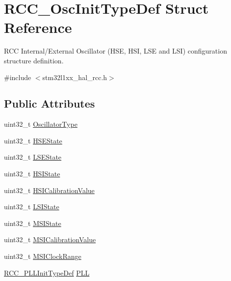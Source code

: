 \hypertarget{struct_r_c_c___osc_init_type_def}{\section{R\-C\-C\-\_\-\-Osc\-Init\-Type\-Def Struct Reference}
\label{struct_r_c_c___osc_init_type_def}
}


R\-C\-C Internal/\-External Oscillator (H\-S\-E, H\-S\-I, L\-S\-E and L\-S\-I) configuration structure definition.  




{\ttfamily \#include $<$stm32l1xx\-\_\-hal\-\_\-rcc.\-h$>$}

\subsection*{Public Attributes}
\begin{DoxyCompactItemize}
\item 
uint32\-\_\-t \hyperlink{struct_r_c_c___osc_init_type_def_af9e7bc89cab81c1705d94c74c7a81088}{Oscillator\-Type}
\item 
uint32\-\_\-t \hyperlink{struct_r_c_c___osc_init_type_def_a7e05d6eec98ed8cdaba00ca3d167ff72}{H\-S\-E\-State}
\item 
uint32\-\_\-t \hyperlink{struct_r_c_c___osc_init_type_def_a7c1294e9407e69e80fe034caf35fe7ea}{L\-S\-E\-State}
\item 
uint32\-\_\-t \hyperlink{struct_r_c_c___osc_init_type_def_a39b62cae65fe7a251000354e5bba8cb6}{H\-S\-I\-State}
\item 
uint32\-\_\-t \hyperlink{struct_r_c_c___osc_init_type_def_a9b2e48e452d0c334f2b9473216064560}{H\-S\-I\-Calibration\-Value}
\item 
uint32\-\_\-t \hyperlink{struct_r_c_c___osc_init_type_def_a955de90db8882fde02c4fb59c7c000f0}{L\-S\-I\-State}
\item 
uint32\-\_\-t \hyperlink{struct_r_c_c___osc_init_type_def_ae195d3c855a814b931f7cf57e4fc3fe6}{M\-S\-I\-State}
\item 
uint32\-\_\-t \hyperlink{struct_r_c_c___osc_init_type_def_a62152a6e80ade492afa6753ea2acc673}{M\-S\-I\-Calibration\-Value}
\item 
uint32\-\_\-t \hyperlink{struct_r_c_c___osc_init_type_def_adaab402d37223348fcc96aeaf7643045}{M\-S\-I\-Clock\-Range}
\item 
\hyperlink{struct_r_c_c___p_l_l_init_type_def}{R\-C\-C\-\_\-\-P\-L\-L\-Init\-Type\-Def} \hyperlink{struct_r_c_c___osc_init_type_def_af76de5ee86798f0c3a4c83c84dfa58be}{P\-L\-L}
\end{DoxyCompactItemize}



